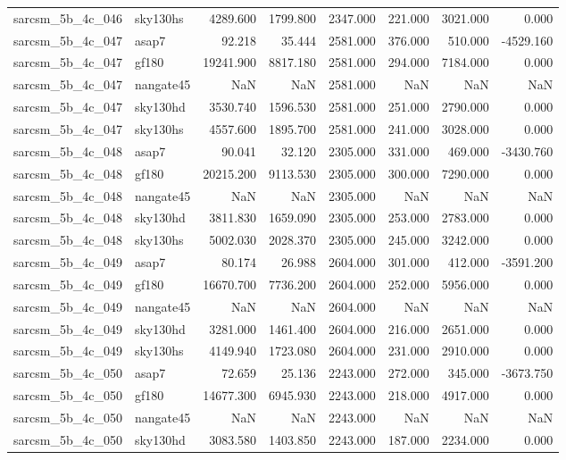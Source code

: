 \begin{tabular}{llrrrrrr}
sarcsm\_5b\_4c\_046 & sky130hs & 4289.600 & 1799.800 & 2347.000 & 221.000 & 3021.000 & 0.000 \\
sarcsm\_5b\_4c\_047 & asap7 & 92.218 & 35.444 & 2581.000 & 376.000 & 510.000 & -4529.160 \\
sarcsm\_5b\_4c\_047 & gf180 & 19241.900 & 8817.180 & 2581.000 & 294.000 & 7184.000 & 0.000 \\
sarcsm\_5b\_4c\_047 & nangate45 & NaN & NaN & 2581.000 & NaN & NaN & NaN \\
sarcsm\_5b\_4c\_047 & sky130hd & 3530.740 & 1596.530 & 2581.000 & 251.000 & 2790.000 & 0.000 \\
sarcsm\_5b\_4c\_047 & sky130hs & 4557.600 & 1895.700 & 2581.000 & 241.000 & 3028.000 & 0.000 \\
sarcsm\_5b\_4c\_048 & asap7 & 90.041 & 32.120 & 2305.000 & 331.000 & 469.000 & -3430.760 \\
sarcsm\_5b\_4c\_048 & gf180 & 20215.200 & 9113.530 & 2305.000 & 300.000 & 7290.000 & 0.000 \\
sarcsm\_5b\_4c\_048 & nangate45 & NaN & NaN & 2305.000 & NaN & NaN & NaN \\
sarcsm\_5b\_4c\_048 & sky130hd & 3811.830 & 1659.090 & 2305.000 & 253.000 & 2783.000 & 0.000 \\
sarcsm\_5b\_4c\_048 & sky130hs & 5002.030 & 2028.370 & 2305.000 & 245.000 & 3242.000 & 0.000 \\
sarcsm\_5b\_4c\_049 & asap7 & 80.174 & 26.988 & 2604.000 & 301.000 & 412.000 & -3591.200 \\
sarcsm\_5b\_4c\_049 & gf180 & 16670.700 & 7736.200 & 2604.000 & 252.000 & 5956.000 & 0.000 \\
sarcsm\_5b\_4c\_049 & nangate45 & NaN & NaN & 2604.000 & NaN & NaN & NaN \\
sarcsm\_5b\_4c\_049 & sky130hd & 3281.000 & 1461.400 & 2604.000 & 216.000 & 2651.000 & 0.000 \\
sarcsm\_5b\_4c\_049 & sky130hs & 4149.940 & 1723.080 & 2604.000 & 231.000 & 2910.000 & 0.000 \\
sarcsm\_5b\_4c\_050 & asap7 & 72.659 & 25.136 & 2243.000 & 272.000 & 345.000 & -3673.750 \\
sarcsm\_5b\_4c\_050 & gf180 & 14677.300 & 6945.930 & 2243.000 & 218.000 & 4917.000 & 0.000 \\
sarcsm\_5b\_4c\_050 & nangate45 & NaN & NaN & 2243.000 & NaN & NaN & NaN \\
sarcsm\_5b\_4c\_050 & sky130hd & 3083.580 & 1403.850 & 2243.000 & 187.000 & 2234.000 & 0.000 \\

\end{tabular}

